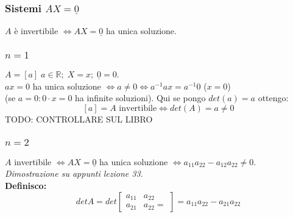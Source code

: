 \subsubsection{Sistemi $AX=\underline{0}$}
$A$ è invertibile $\Leftrightarrow AX=\underline{0}$ ha unica soluzione.

\subsubsection{$n=1$}
$A=[a]\;a\in\mathbb{R};\;X=x;\;\underline{0}=0$.
\\$ax=0$ ha unica soluzione $\Leftrightarrow a\neq 0\Leftrightarrow a^{-1}ax=a^{-1}0$ ($x=0$)
\\(se $a=0: 0\cdot x=0$ ha infinite soluzioni).
Qui se pongo $det(a)=a$ ottengo:
\[[a]=A \text{ invertibile}\Leftrightarrow det(A)=a\neq 0\]
TODO: CONTROLLARE SUL LIBRO

\subsubsection{$n=2$}
$A$ invertibile $\Leftrightarrow AX=\underline{0}$ ha unica soluzione $\Leftrightarrow a_{11}a_{22}-a_{12}a_{22}\neq 0$.
\textit{Dimostrazione su appunti lezione 33.}
\\\textbf{Definisco:}
\[detA=det\begin{bmatrix}a_{11} & a_{22} \\ a_{21} & a_{22}=\end{bmatrix}=a_{11}a_{22}-a_{21}a_{22}\]

